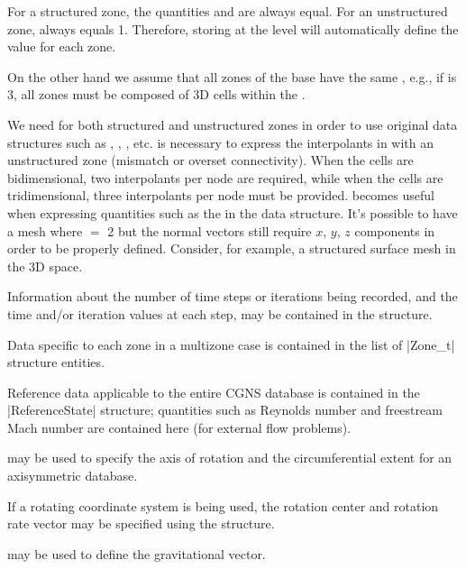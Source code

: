 For a structured zone, the quantities  and
 are always equal.
For an unstructured zone,  always equals 1.
Therefore, storing  at the  level
will automatically define the  value for each zone.

On the other hand we assume that all zones of the base have the same
, e.g., if  is 3, all zones
must be composed of 3D cells within the .

We need  for both structured and
unstructured zones in order to use original data structures
such as , ,
, etc.
 is necessary to express the interpolants in
 with an unstructured zone (mismatch or overset
connectivity).
When the cells are bidimensional, two interpolants per node are required,
while when the cells are tridimensional, three interpolants per node must
be provided.
 becomes useful when expressing quantities
such as the  in the  data structure.
It's possible to have a mesh where  $=$ 2 but the
normal vectors still require $x$, $y$, $z$ components in order to be
properly defined.
Consider, for example, a structured surface mesh in the 3D space.

Information about the number of time steps or iterations being recorded,
and the time and/or iteration values at each step, may be contained in
the  structure.

Data specific to each zone in a multizone case is contained in the
list of |Zone_t| structure entities.

Reference data applicable to the entire CGNS database is contained in the
|ReferenceState| structure; quantities such as Reynolds number and
freestream Mach number are contained here (for external flow problems).

 may be used to specify the axis of rotation and the
circumferential extent for an axisymmetric database.

If a rotating coordinate system is being used, the rotation
center and rotation rate vector may be specified using the
 structure.

 may be used to define the gravitational vector.

